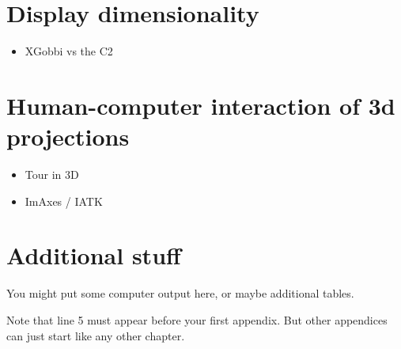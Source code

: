 \documentclass{monashthesis}
\begin{document}
\hypertarget{ch:disp_dim}{%
\chapter{Display dimensionality}\label{ch:disp_dim}}

\begin{itemize}
\tightlist
\item
  XGobbi vs the C2
\end{itemize}

\hypertarget{ch:hci_3dproj}{%
\chapter{Human-computer interaction of 3d projections}\label{ch:hci_3dproj}}

\begin{itemize}
\tightlist
\item
  Tour in 3D
\item
  ImAxes / IATK
\end{itemize}

\appendix

\hypertarget{additional-stuff}{%
\chapter{Additional stuff}\label{additional-stuff}}

You might put some computer output here, or maybe additional tables.

Note that line 5 must appear before your first appendix. But other appendices can just start like any other chapter.

\printbibliography[heading=bibintoc]
\end{document}
